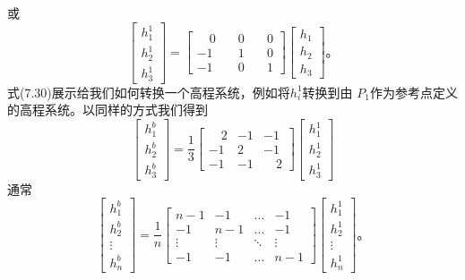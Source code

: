 或\begin{equation}
	\begin{bmatrix}
		h_{1}^{1}\\
		h_{2}^{1}\\
		h_{3}^{1}
	\end{bmatrix}
	=\begin{bmatrix}
		\quad0 & \quad0 & \quad0\\
		-1 & \quad1 & \quad0\\
		-1 & \quad0 & \quad1
	\end{bmatrix}
	\begin{bmatrix}
		h_{1}\\
		h_{2}\\
		h_{3}
	\end{bmatrix}\text{。}
\end{equation}
式(7.30)展示给我们如何转换一个高程系统，例如将$h_{i}^{1}$转换到由 $P_1$作为参考点定义的高程系统。以同样的方式我们得到
\begin{equation*}
	\begin{bmatrix}
		h_{1}^{b}\\
		h_{2}^{b}\\
		h_{3}^{b}
	\end{bmatrix}
	=\frac{1}{3}
	\begin{bmatrix}
		\quad2 & -1 & -1\\
		-1 & 2 & -1\\
		-1 & -1 & \quad2
	\end{bmatrix}
	\begin{bmatrix}
		h_{1}^{1}\\
		h_{2}^{1}\\
		h_{3}^{1}
	\end{bmatrix}
\end{equation*}
通常
\begin{equation}
	\begin{bmatrix}
		h_{1}^{b}\\
		h_{2}^{b}\\
		\vdots\\
		h_{n}^{b}
	\end{bmatrix}
	=\frac{1}{n}
	\begin{bmatrix}
		n - 1 & -1 & \ldots&-1\\
		-1 &  n - 1& \ldots&-1\\
		\vdots&\vdots&\ddots&\vdots\\
		-1 & -1 &\ldots&   n - 1
	\end{bmatrix}
	\begin{bmatrix}
		h_{1}^{1}\\
		h_{2}^{1}\\
		\vdots\\
		h_{n}^{1}
	\end{bmatrix}\text{。}
\end{equation}
